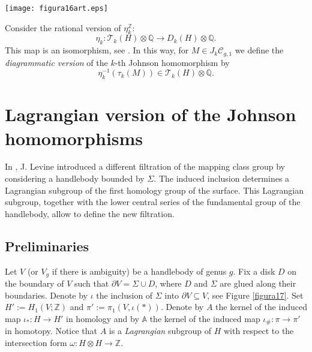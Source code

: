 \documentclass[10pt]{amsart}
\numberwithin{equation}{section}
\numberwithin{equation}{section}
\theoremstyle{definition}
\begin{document}
\bigskip

\centerline{\texttt{[image: figura16art.eps]}}

\medskip

Consider the rational version of  $\eta^{\mathbb{Z}}_k$: 
\begin{equation}\label{ecuacion4.15treerat}%
\eta_k:\mathcal{T}_k(H)\otimes\mathbb{Q}\longrightarrow D_k(H)\otimes\mathbb{Q}.
\end{equation}
This map  is an isomorphism, see \cite[Corollary 3.2]{MR1943338}.  In this way, for $M\in J_k\mathcal{C}_{g,1}$ we define the \emph{diagrammatic version} of the $k$-th Johnson homomorphism by
$$\eta_k^{-1}(\tau_k(M))\in \mathcal{T}_k(H)\otimes\mathbb{Q}.$$



\section{Lagrangian version of the Johnson homomorphisms}\label{seccion3}%

In \cite{MR1823501,MR2265877}, J. Levine introduced a different filtration of the mapping class group by considering a handlebody bounded by $\Sigma$. The induced inclusion determines a  Lagrangian subgroup of the first homology group of the surface. This Lagrangian subgroup, together with the lower central series of the fundamental group of the handlebody, allow to define the new filtration. 

\subsection{Preliminaries}\label{seccion3.1} Let $V$ (or $V_g$ if there is ambiguity) be a handlebody of genus $g$. Fix a disk $D$ on the boundary of $V$ such that $\partial V=\Sigma\cup D$, where $D$ and $\Sigma$ are glued along their boundaries. Denote by  $\iota$ the inclusion of $\Sigma$ into $\partial V\subseteq V$, see Figure \ref{figura17}. Set $H':=H_1(V;\mathbb{Z})$ and $\pi':=\pi_1(V,\iota(*))$. Denote by $A$ the kernel of the induced map $\iota_*:H\rightarrow H'$ in homology and by  $\mathbb{A}$ the kernel of the induced map $\iota_{\#}:\pi\rightarrow\pi'$ in homotopy. Notice that $A$ is a \emph{Lagrangian}  subgroup of $H$  with respect to the intersection form $\omega:H\otimes H\rightarrow\mathbb{Z}$.
\end{document}
